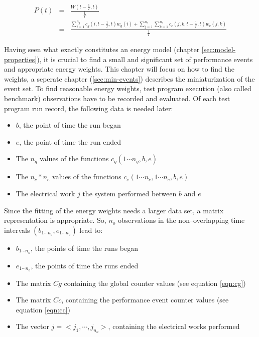 \begin{eqnarray}
P(t) & = & \frac{W(t - \frac{1}{T}, t)}{\frac{1}{T}} \\
     & = & \frac{\sum\limits_{i=1}^{n_g} c_g(i, t - \frac{1}{T}, t) w_g(i) +
                 \sum\limits_{j=1}^{n_c}
                 \sum\limits_{k=1}^{n_e} c_e(j, k, t - \frac{1}{T}, t) w_e(j, k)
                }{\frac{1}{T}}
\end{eqnarray}


\label{sec:finding-weights}

Having seen what exactly constitutes an energy model (chapter
\ref{sec:model-properties}), it is crucial to find a small and significant set
of performance events and appropriate energy weights. This chapter will focus on
how to find the weights, a seperate chapter (\ref{sec:min-events}) describes the
miniaturization of the event set. To find reasonable energy weights, test
program execution (also called benchmark) observations have to be recorded and
evaluated. Of each test program run record, the following data is needed later:

\begin{itemize}

\item $b$, the point of time the run began

\item $e$, the point of time the run ended

\item The $n_g$ values of the functions $c_g(1 \cdots n_g, b, e)$

\item The $n_c * n_e$ values of the functions
$c_e(1 \cdots n_c, 1 \cdots n_e, b, e)$

\item The electrical work $j$ the system performed between $b$ and $e$

\end{itemize}

Since the fitting of the energy weights needs a larger data set, a matrix
representation is appropriate. So, $n_o$ observations in the non--overlapping
time intervals $(b_{1 \cdots n_o}, e_{1 \cdots n_o})$ lead to:

\begin{itemize}

\item $b_{1 \cdots n_o}$, the points of time the runs began

\item $e_{1 \cdots n_o}$, the points of time the runs ended

\item The matrix $Cg$ containing the global counter values (see equation
\ref{eqn:cg})

\item The matrix $Cc$, containing the performance event counter values (see
equation \ref{eqn:cc})

\item The vector $j = <j_1, \cdots, j_{n_o}>$, containing the electrical works
performed

\end{itemize}

